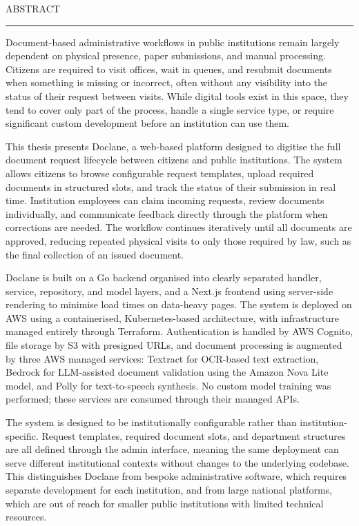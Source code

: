 \documentclass[12pt]{report}
\begin{document}
\cleardoublepage
ABSTRACT
\vspace{0.5cm}	
\hrule
\vspace{0.5cm}	

Document-based administrative workflows in public institutions remain largely dependent on physical presence, paper submissions, and manual processing. Citizens are required to visit offices, wait in queues, and resubmit documents when something is missing or incorrect, often without any visibility into the status of their request between visits. While digital tools exist in this space, they tend to cover only part of the process, handle a single service type, or require significant custom development before an institution can use them.

This thesis presents Doclane, a web-based platform designed to digitise the full document request lifecycle between citizens and public institutions. The system allows citizens to browse configurable request templates, upload required documents in structured slots, and track the status of their submission in real time. Institution employees can claim incoming requests, review documents individually, and communicate feedback directly through the platform when corrections are needed. The workflow continues iteratively until all documents are approved, reducing repeated physical visits to only those required by law, such as the final collection of an issued document.

Doclane is built on a Go backend organised into clearly separated handler, service, repository, and model layers, and a Next.js frontend using server-side rendering to minimise load times on data-heavy pages. The system is deployed on AWS using a containerised, Kubernetes-based architecture, with infrastructure managed entirely through Terraform. Authentication is handled by AWS Cognito, file storage by S3 with presigned URLs, and document processing is augmented by three AWS managed services: Textract for OCR-based text extraction, Bedrock for LLM-assisted document validation using the Amazon Nova Lite model, and Polly for text-to-speech synthesis. No custom model training was performed; these services are consumed through their managed APIs.

The system is designed to be institutionally configurable rather than institution-specific. Request templates, required document slots, and department structures are all defined through the admin interface, meaning the same deployment can serve different institutional contexts without changes to the underlying codebase. This distinguishes Doclane from bespoke administrative software, which requires separate development for each institution, and from large national platforms, which are out of reach for smaller public institutions with limited technical resources.
\end{document}
